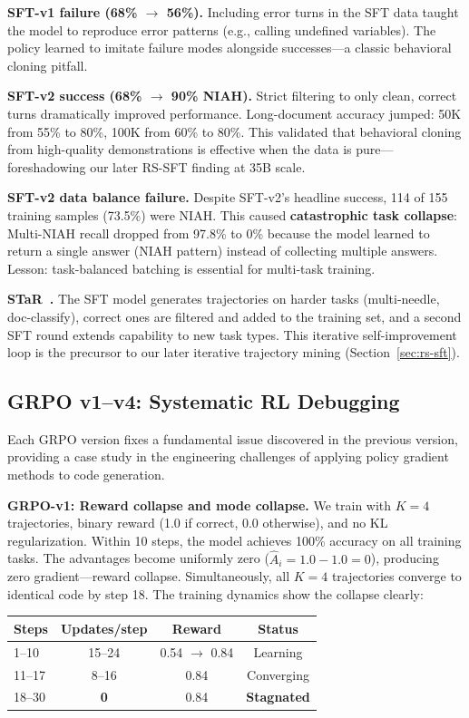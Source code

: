 \documentclass{article}
\begin{document}
\textbf{SFT-v1 failure (68\% $\to$ 56\%).} Including error turns in the SFT data taught the model to reproduce error patterns (e.g., calling undefined variables). The policy learned to imitate failure modes alongside successes---a classic behavioral cloning pitfall.

\textbf{SFT-v2 success (68\% $\to$ 90\% NIAH).} Strict filtering to only clean, correct turns dramatically improved performance. Long-document accuracy jumped: 50K from 55\% to 80\%, 100K from 60\% to 80\%. This validated that behavioral cloning from high-quality demonstrations is effective when the data is pure---foreshadowing our later RS-SFT finding at 35B scale.

\textbf{SFT-v2 data balance failure.} Despite SFT-v2's headline success, 114 of 155 training samples (73.5\%) were NIAH. This caused \textbf{catastrophic task collapse}: Multi-NIAH recall dropped from 97.8\% to 0\% because the model learned to return a single answer (NIAH pattern) instead of collecting multiple answers. Lesson: task-balanced batching is essential for multi-task training.

\textbf{STaR~\cite{zelikman2022star}.} The SFT model generates trajectories on harder tasks (multi-needle, doc-classify), correct ones are filtered and added to the training set, and a second SFT round extends capability to new task types. This iterative self-improvement loop is the precursor to our later iterative trajectory mining (Section~\ref{sec:rs-sft}).

\subsection{GRPO v1--v4: Systematic RL Debugging}

Each GRPO version fixes a fundamental issue discovered in the previous version, providing a case study in the engineering challenges of applying policy gradient methods to code generation.

\textbf{GRPO-v1: Reward collapse and mode collapse.} We train with $K{=}4$ trajectories, binary reward (1.0 if correct, 0.0 otherwise), and no KL regularization. Within 10 steps, the model achieves 100\% accuracy on all training tasks. The advantages become uniformly zero ($\hat{A}_i = 1.0 - 1.0 = 0$), producing zero gradient---reward collapse. Simultaneously, all $K{=}4$ trajectories converge to identical code by step 18. The training dynamics show the collapse clearly:

\begin{center}
\begin{small}
\begin{tabular}{lccc}
\toprule
Steps & Updates/step & Reward & Status \\
\midrule
1--10 & 15--24 & 0.54 $\to$ 0.84 & Learning \\
11--17 & 8--16 & 0.84 & Converging \\
18--30 & \textbf{0} & 0.84 & \textbf{Stagnated} \\
\bottomrule
\end{tabular}
\end{small}
\end{center}
\end{document}
